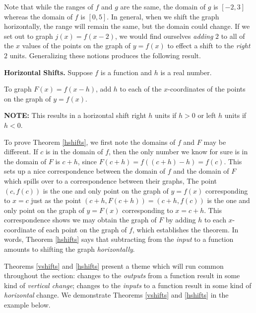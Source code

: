 Note that while the ranges of $f$ and $g$ are the same, the domain of $g$ is $[-2,3]$ whereas the domain of $f$ is $[0,5]$.  In general, when we shift the graph horizontally, the range will remain the same, but the domain could change.  If we set out to graph $j(x) = f(x-2)$, we would find ourselves \textit{adding} $2$ to all of the $x$ values of the points on the graph of $y=f(x)$ to effect a shift to the \emph{right} $2$ units. Generalizing these notions produces the following result.

\smallskip

\colorbox{ResultColor}{\bbm


\begin{thm} \label{hshifts}\textbf{Horizontal Shifts.}  Suppose $f$ is a function and $h$ is a real number. 

To graph $F(x) = f(x-h)$,  add $h$ to each of the $x$-coordinates of the points on the graph of $y=f(x)$.

\textbf{NOTE:}  This results in a horizontal shift right $h$ units if $h > 0$ or left $h$ units if $h< 0$.

\end{thm}

\ebm}

\smallskip

To prove Theorem \ref{hshifts}, we first note the domains of $f$ and $F$ may be different.   If $c$ is in the domain of $f$, then the only number we know for sure is in the domain of $F$ is  $c+h$, since $F(c+h) = f((c+h)-h) = f(c)$.  This sets up a nice correspondence between the domain of $f$ and the domain of $F$ which spills over to a correspondence between their graphs,  The point $(c, f(c))$ is the one and only point on the graph of $y = f(x)$ corresponding to $x=c$ just as the point $(c+h, F(c+h)) = (c+h, f(c))$ is the one and only point on the graph of $y = F(x)$ corresponding to $x=c+h$.  This correspondence shows we may obtain the graph of $F$ by adding $h$ to each $x$-coordinate of each point on the graph of $f$, which establishes the theorem. In words, Theorem \ref{hshifts} says that subtracting from the  \textit{input} to a function amounts to shifting the graph \textit{horizontally}. 

\smallskip

 Theorems \ref{vshifts} and \ref{hshifts} present a theme which will run common throughout the section:  changes to the \textit{outputs} from a function result in some kind of \textit{vertical change};  changes to the \textit{inputs} to a function result in some kind of \textit{horizontal} change.  We demonstrate  Theorems \ref{vshifts} and \ref{hshifts} in the example below.
 
